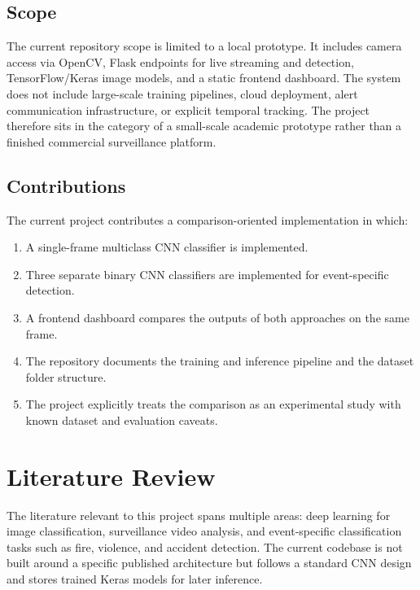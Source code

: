 \documentclass[11pt,a4paper]{article}
\begin{document}
\subsection{Scope}
The current repository scope is limited to a local prototype. It includes camera access via OpenCV, Flask endpoints for live streaming and detection, TensorFlow/Keras image models, and a static frontend dashboard. The system does not include large-scale training pipelines, cloud deployment, alert communication infrastructure, or explicit temporal tracking. The project therefore sits in the category of a small-scale academic prototype rather than a finished commercial surveillance platform.

\subsection{Contributions}
The current project contributes a comparison-oriented implementation in which:
\begin{enumerate}[leftmargin=1.5em]
    \item A single-frame multiclass CNN classifier is implemented.
    \item Three separate binary CNN classifiers are implemented for event-specific detection.
    \item A frontend dashboard compares the outputs of both approaches on the same frame.
    \item The repository documents the training and inference pipeline and the dataset folder structure.
    \item The project explicitly treats the comparison as an experimental study with known dataset and evaluation caveats.
\end{enumerate}

\section{Literature Review}
The literature relevant to this project spans multiple areas: deep learning for image classification, surveillance video analysis, and event-specific classification tasks such as fire, violence, and accident detection. The current codebase is not built around a specific published architecture but follows a standard CNN design and stores trained Keras models for later inference.
\end{document}
